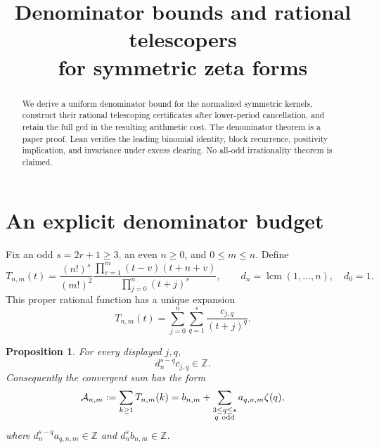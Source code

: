 \documentclass[11pt]{article}
\title{Denominator bounds and rational telescopers\\for symmetric zeta forms}
\author{}
\date{}
\newtheorem{proposition}{Proposition}
\newcommand{\Z}{\mathbb Z}
\begin{document}
\maketitle
\begin{abstract}
We derive a uniform denominator bound for the normalized symmetric kernels,
construct their rational telescoping certificates after lower-period
cancellation, and retain the full gcd in the resulting arithmetic cost.
The denominator theorem is a paper proof. Lean verifies the leading
binomial identity, block recurrence, positivity implication, and invariance
under excess clearing. No all-odd irrationality theorem is claimed.
\end{abstract}

\section{An explicit denominator budget}
Fix an odd $s=2r+1\ge3$, an even $n\ge0$, and $0\le m\le n$. Define
\[
 T_{n,m}(t)=\frac{(n!)^s}{(m!)^2}
 \frac{\prod_{v=1}^m(t-v)(t+n+v)}
      {\prod_{j=0}^n(t+j)^s},\qquad
 d_n=\operatorname{lcm}(1,\ldots,n),\quad d_0=1.
\]
This proper rational function has a unique expansion
\[
 T_{n,m}(t)=\sum_{j=0}^n\sum_{q=1}^s\frac{c_{j,q}}{(t+j)^q}.
\]
\begin{proposition}
For every displayed $j,q$,
\begin{equation}
 d_n^{s-q}c_{j,q}\in\Z.
 \label{eq:budget}
\end{equation}
Consequently the convergent sum has the form
\[
 \mathcal A_{n,m}:=\sum_{k\ge1}T_{n,m}(k)
   =b_{n,m}+\sum_{\substack{3\le q\le s\\q\ {\rm odd}}}
                  a_{q,n,m}\zeta(q),
\]
where $d_n^{s-q}a_{q,n,m}\in\Z$ and $d_n^s b_{n,m}\in\Z$.
\end{proposition}
\end{document}
